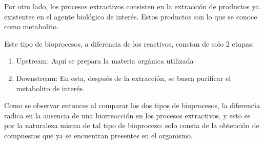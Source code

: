 Por otro lado, los procesos extractivos consisten en la extracción de productos ya existentes en el agente biológico de interés. Estos productos son lo que se conoce como metabolito.

Este tipo de bioprocesos, a diferencia de los reactivos, constan de solo 2 etapas:

\begin{enumerate}
    \item Upstream: Aquí se prepara la materia orgánica utilizada
    \item Downstream: En esta, después de la extracción, se busca purificar el metabolito de interés.
\end{enumerate}

Como se observar entonces al comparar los dos tipos de bioprocesos, la diferencia radica en la ausencia de una biorreacción en los procesos extractivos, y esto es por la naturaleza misma de tal tipo de bioproceso: solo consta de la obtención de compuestos que ya se encuentran presentes en el organismo.